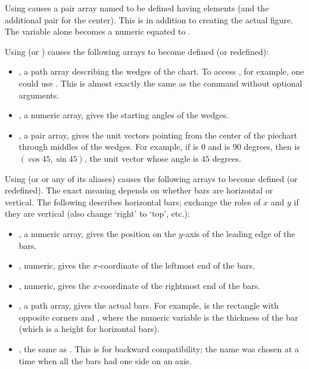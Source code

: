\documentclass[letterpaper]{article}
\begin{document}
Using  causes a
pair array named  to be defined having  elements (and
the additional pair  for the center). This is in addition to
creating the actual figure. The variable  alone becomes a numeric
equated to .

Using  (or ) causes the following arrays to
become defined (or redefined):
\begin{itemize}
  \item {}, a path array describing the wedges of the chart.
        To access , for example, one could use
        . This is almost exactly the
        same as the \mfp{} command  without
        optional arguments.
  \item {}, a numeric array, gives the starting angles of
        the wedges.
  \item {}, a pair array, gives the unit vectors
        pointing from the center of the piechart through middles of the
        wedges. For example, if  is 0 and 
        is 90 degrees, then  is $(\cos 45,\sin 45)$,
        the unit vector whose angle is $45$ degrees.
\end{itemize}

Using  (or  or any of its aliases) causes
the following arrays to become defined (or redefined). The exact meaning
depends on whether bars are horizontal or vertical. The following
describes horizontal bars; exchange the roles of $x$ and $y$ if they are
vertical (also change `right' to `top', etc.):
\begin{itemize}
  \item {}, a numeric array, gives the position on the
        $y$-axis of the leading edge of the bars.
  \item {}, numeric, gives the $x$-coordinate of the
        leftmost end of the bars.
  \item {}, numeric, gives the $x$-coordinate of the rightmost
        end of the bars.
  \item {}, a path array, gives the actual bars. For
        example,  is the rectangle with opposite corners
         and ,
        where the numeric variable  is the thickness of the
        bar (which is a height for horizontal bars).
  \item {}, the same as . This is for backward
        compatibility; the name was chosen at a time when all the bars
        had one side on an axis.
\end{itemize}
\end{document}
